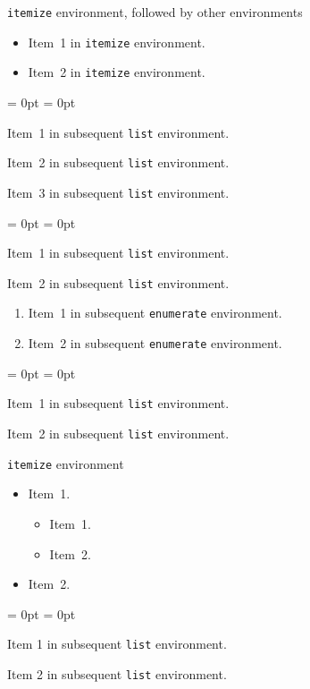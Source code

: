 \documentclass[aspectratio = 169, t, 10pt]{beamer}
\begin{document}
\begin{frame}{\texttt{itemize} environment, followed by other environments}


\begin{itemize}
	\item Item~1 in \texttt{itemize} environment.
	\item Item~2 in \texttt{itemize} environment.
\end{itemize}

\begin{list}{}{\leftmargin = 0pt \itemindent = 0pt}
	\item Item~1 in subsequent \texttt{list} environment.
	\item Item~2 in subsequent \texttt{list} environment.
	\item Item~3 in subsequent \texttt{list} environment.
\end{list}

\begin{list}{}{\leftmargin = 0pt \itemindent = 0pt}
	\item Item~1 in subsequent \texttt{list} environment.
	\item Item~2 in subsequent \texttt{list} environment.
\end{list}

\begin{enumerate}
	\item Item~1 in subsequent \texttt{enumerate} environment.
	\item Item~2 in subsequent \texttt{enumerate} environment.
\end{enumerate}

\begin{list}{}{\leftmargin = 0pt \itemindent = 0pt}
	\item Item~1 in subsequent \texttt{list} environment.
	\item Item~2 in subsequent \texttt{list} environment.
\end{list}

\end{frame}


\begin{frame}{\texttt{itemize} environment}

\begin{itemize}
	\item Item~1. \par
	\begin{itemize}
		\item Item~1.
		\item Item~2.
	\end{itemize}
	\item Item~2.
\end{itemize}

\begin{list}{}{\leftmargin = 0pt \itemindent = 0pt}
	\item Item 1 in subsequent \texttt{list} environment.
	\item Item 2 in subsequent \texttt{list} environment.
\end{list}

\end{frame}
\end{document}
